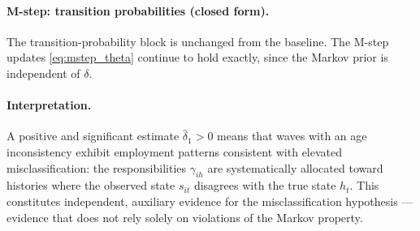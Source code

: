 \documentclass[12pt]{article}
\begin{document}
\paragraph{M-step: transition probabilities (closed form).}
The transition-probability block is unchanged from the baseline. The
M-step updates \eqref{eq:mstep_theta} continue to hold exactly, since
the Markov prior is independent of \(\delta\).

\paragraph{Interpretation.}
A positive and significant estimate \(\hat\delta_1 > 0\) means that
waves with an age inconsistency exhibit employment patterns consistent
with elevated misclassification: the responsibilities \(\gamma_{ih}\)
are systematically allocated toward histories where the observed state
\(s_{it}\) disagrees with the true state \(h_t\). This constitutes
independent, auxiliary evidence for the misclassification hypothesis
--- evidence that does not rely solely on violations of the Markov
property.
\end{document}
